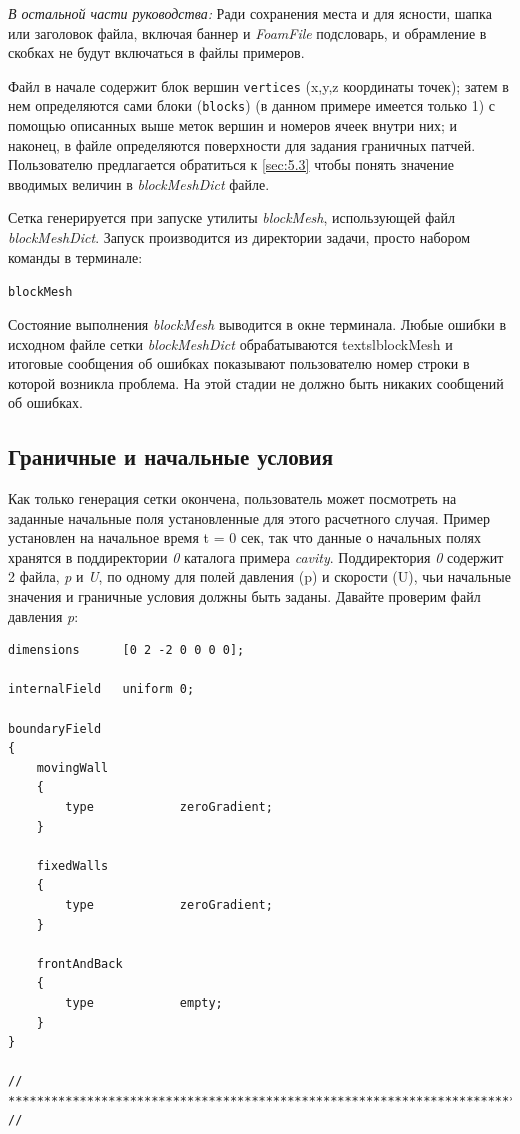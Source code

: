\textit{В остальной части руководства:}
Ради сохранения места и для ясности, шапка или заголовок файла, включая баннер и \textsl{FoamFile} подсловарь,
 и обрамление в скобках не будут включаться в файлы примеров.

Файл в начале содержит блок вершин \texttt{vertices} (x,y,z координаты точек); затем в нем определяются сами блоки
 (\texttt{blocks})  (в данном примере имеется только 1) с помощью описанных выше меток вершин и номеров
 ячеек внутри них; и наконец, в файле определяются поверхности для задания граничных патчей.
 Пользователю предлагается обратиться к \autoref{sec:5.3} чтобы понять значение вводимых  величин в \textsl{blockMeshDict} файле.

Сетка генерируется при запуске утилиты \textsl{blockMesh}, использующей файл \textsl{blockMeshDict}.
Запуск производится из директории задачи, просто набором команды в терминале:

\texttt{blockMesh}

Состояние выполнения \textsl{blockMesh} выводится в окне терминала. Любые ошибки в исходном 
файле сетки \textsl{blockMeshDict} обрабатываются textsl{blockMesh} и итоговые сообщения об ошибках показывают 
пользователю номер строки в которой возникла проблема. На этой стадии не должно быть никаких сообщений об ошибках.

\subsection{Граничные и начальные условия}
\label{sssec:2.1.1.2}

Как только генерация сетки окончена, пользователь может посмотреть на заданные начальные поля установленные для этого
 расчетного случая. Пример установлен на начальное время t = 0 сек, так что данные о начальных полях
 хранятся в поддиректории \textit{0} каталога примера \textit{cavity}. Поддиректория \textit{0} содержит
 2 файла, \textit{p} и \textit{U}, по одному для полей давления (p) и скорости (U),
 чьи начальные значения и граничные условия должны быть заданы. Давайте проверим файл давления \textit{p}:

\begin{verbatim}
dimensions      [0 2 -2 0 0 0 0];

internalField   uniform 0;

boundaryField
{
    movingWall      
    {
        type            zeroGradient;
    }

    fixedWalls      
    {
        type            zeroGradient;
    }

    frontAndBack    
    {
        type            empty;
    }
}

// ************************************************************************* // 
\end{verbatim} 

